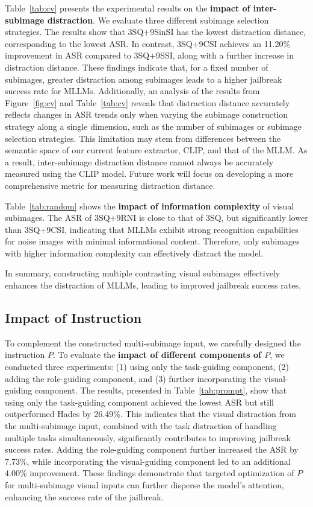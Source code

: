 Table~\ref{tab:cv} presents the experimental results on the \textbf{impact of inter-subimage distraction}. We evaluate three different subimage selection strategies. The results show that 3SQ+9SinSI has the lowest distraction distance, corresponding to the lowest ASR. In contrast, 3SQ+9CSI achieves an 11.20\% improvement in ASR compared to 3SQ+9SSI, along with a further increase in distraction distance. These findings indicate that, for a fixed number of subimages, greater distraction among subimages leads to a higher jailbreak success rate for MLLMs. Additionally, an analysis of the results from Figure~\ref{fig:cv} and Table~\ref{tab:cv} reveals that distraction distance accurately reflects changes in ASR trends only when varying the subimage construction strategy along a single dimension, such as the number of subimages or subimage selection strategies. This limitation may stem from differences between the semantic space of our current feature extractor, CLIP, and that of the MLLM. As a result, inter-subimage distraction distance cannot always be accurately measured using the CLIP model. Future work will focus on developing a more comprehensive metric for measuring distraction distance.

Table~\ref{tab:random} shows the \textbf{impact of information complexity} of visual subimages. The ASR of 3SQ+9RNI is close to that of 3SQ, but significantly lower than 3SQ+9CSI, indicating that MLLMs exhibit strong recognition capabilities for noise images with minimal informational content. Therefore, only subimages with higher information complexity can effectively distract the model.

In summary, constructing multiple contrasting visual subimages effectively enhances the distraction of MLLMs, leading to improved jailbreak success rates.






\subsection{Impact of Instruction}



To complement the constructed multi-subimage input, we carefully designed the instruction $P$. To evaluate the \textbf{impact of different components of $P$}, we conducted three experiments: (1) using only the task-guiding component, (2) adding the role-guiding component, and (3) further incorporating the visual-guiding component. The results, presented in Table~\ref{tab:prompt}, show that using only the task-guiding component achieved the lowest ASR but still outperformed Hades by 26.49\%. This indicates that the visual distraction from the multi-subimage input, combined with the task distraction of handling multiple tasks simultaneously, significantly contributes to improving jailbreak success rates. Adding the role-guiding component further increased the ASR by 7.73\%, while incorporating the visual-guiding component led to an additional 4.00\% improvement. These findings demonstrate that targeted optimization of $P$ for multi-subimage visual inputs can further disperse the model’s attention, enhancing the success rate of the jailbreak.


